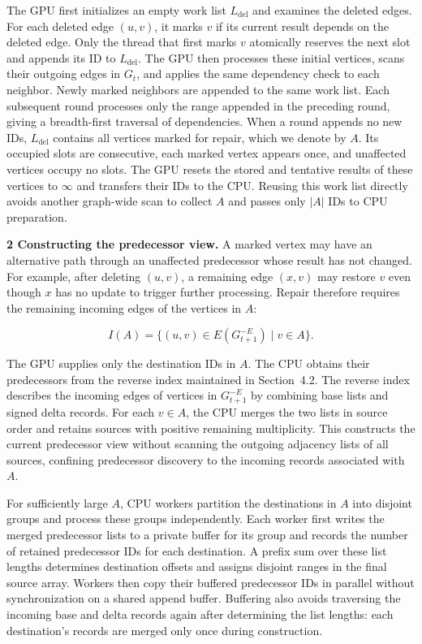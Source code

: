 The GPU first initializes an empty work list $L_{\mathrm{del}}$ and examines the deleted edges. For each deleted edge $(u,v)$, it marks $v$ if its current result depends on the deleted edge. Only the thread that first marks $v$ atomically reserves the next slot and appends its ID to $L_{\mathrm{del}}$. The GPU then processes these initial vertices, scans their outgoing edges in $G_t$, and applies the same dependency check to each neighbor. Newly marked neighbors are appended to the same work list. Each subsequent round processes only the range appended in the preceding round, giving a breadth-first traversal of dependencies. When a round appends no new IDs, $L_{\mathrm{del}}$ contains all vertices marked for repair, which we denote by $A$. Its occupied slots are consecutive, each marked vertex appears once, and unaffected vertices occupy no slots. The GPU resets the stored and tentative results of these vertices to $\infty$ and transfers their IDs to the CPU. Reusing this work list directly avoids another graph-wide scan to collect $A$ and passes only $|A|$ IDs to CPU preparation.

\textbf{2 Constructing the predecessor view.} A marked vertex may have an alternative path through an unaffected predecessor whose result has not changed. For example, after deleting $(u,v)$, a remaining edge $(x,v)$ may restore $v$ even though $x$ has no update to trigger further processing. Repair therefore requires the remaining incoming edges of the vertices in $A$:

\begin{equation}
I(A)=\{(u,v)\in E(G_{t+1}^{-E})\mid v\in A\}.
\tag{5.1}
\end{equation}

The GPU supplies only the destination IDs in $A$. The CPU obtains their predecessors from the reverse index maintained in Section~4.2. The reverse index describes the incoming edges of vertices in $G_{t+1}^{-E}$ by combining base lists and signed delta records. For each $v\in A$, the CPU merges the two lists in source order and retains sources with positive remaining multiplicity. This constructs the current predecessor view without scanning the outgoing adjacency lists of all sources, confining predecessor discovery to the incoming records associated with $A$.

For sufficiently large $A$, CPU workers partition the destinations in $A$ into disjoint groups and process these groups independently. Each worker first writes the merged predecessor lists to a private buffer for its group and records the number of retained predecessor IDs for each destination. A prefix sum over these list lengths determines destination offsets and assigns disjoint ranges in the final source array. Workers then copy their buffered predecessor IDs in parallel without synchronization on a shared append buffer. Buffering also avoids traversing the incoming base and delta records again after determining the list lengths: each destination's records are merged only once during construction.

